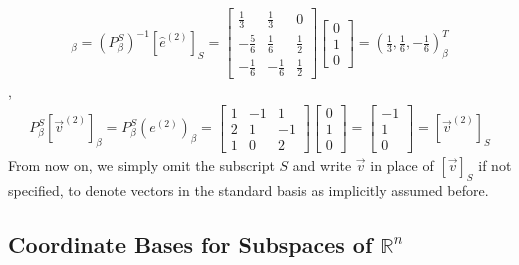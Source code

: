 \begin{solution}
{\begin{align*}
[\hat{e}^{(2)}]_\beta =
(P_\beta^S)^{-1} [\hat{e}^{(2)}]_S =
\begin{bmatrix}
\frac{1}{3} & \frac{1}{3} & 0\\ 
-\frac{5}{6} & \frac{1}{6} & \frac{1}{2}\\ 
-\frac{1}{6} & -\frac{1}{6} & \frac{1}{2}
\end{bmatrix}
\begin{bmatrix}
0 \\
1 \\
0
\end{bmatrix}
=
\left(\frac{1}{3}, \frac{1}{6}, -\frac{1}{6}\right)_\beta^T
\end{align*}},
\begin{align*}
P_\beta^S [\vec{v}^{(2)}]_\beta =
P_\beta^S (e^{(2)})_\beta =
\begin{bmatrix}
1 & -1 & 1 \\
2 & 1 & -1 \\
1 & 0 & 2
\end{bmatrix}
\begin{bmatrix}
0 \\
1 \\
0
\end{bmatrix}   
=
\begin{bmatrix}
-1 \\
1 \\
0
\end{bmatrix}
= [\vec{v}^{(2)}]_S
\end{align*}
From now on, we simply omit the subscript $S$ and write $\vec{v}$ in place of $[\vec{v}]_S$ if not specified, to denote vectors in the standard basis as implicitly assumed before.
\end{solution}

\subsection{Coordinate Bases for Subspaces of $\mathbb{R}^n$}
\label{section:subspacebasis}

